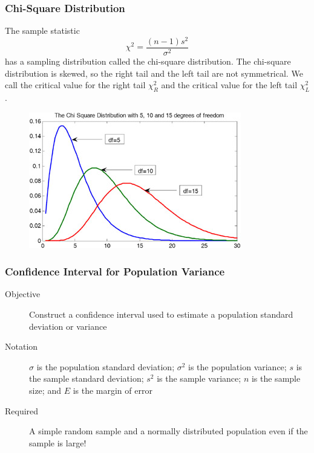 \documentclass[xcolor=dvipsnames]{beamer}
\begin{document}
\begin{frame}
  \frametitle{Chi-Square Distribution}
The sample statistic
\begin{equation}
  \label{eq:neechooy}
  \chi^{2}=\frac{(n-1)s^{2}}{\sigma^{2}}
\end{equation}
has a sampling distribution called the chi-square distribution. The
chi-square distribution is skewed, so the right tail and the left tail
are not symmetrical. We call the critical value for the right tail
$\chi_{R}^{2}$ and the critical value for the left tail
$\chi_{L}^{2}$.
\begin{figure}[h]
  \includegraphics[scale=0.5]{./diagrams/chisqu.jpg}
\end{figure}
\end{frame}

\begin{frame}
  \frametitle{Confidence Interval for Population Variance}
  \begin{description}
  \item[Objective] Construct a confidence interval used to estimate a
    population standard deviation or variance
  \item[Notation] $\sigma$ is the population standard deviation;
    $\sigma^{2}$ is the population variance; $s$ is the sample
    standard deviation; $s^{2}$ is the sample variance; $n$ is the
    sample size; and $E$ is the margin of error
  \item[Required] A simple random sample and a normally distributed
    population even if the sample is large!
  \end{description}
\end{frame}
\end{document}

